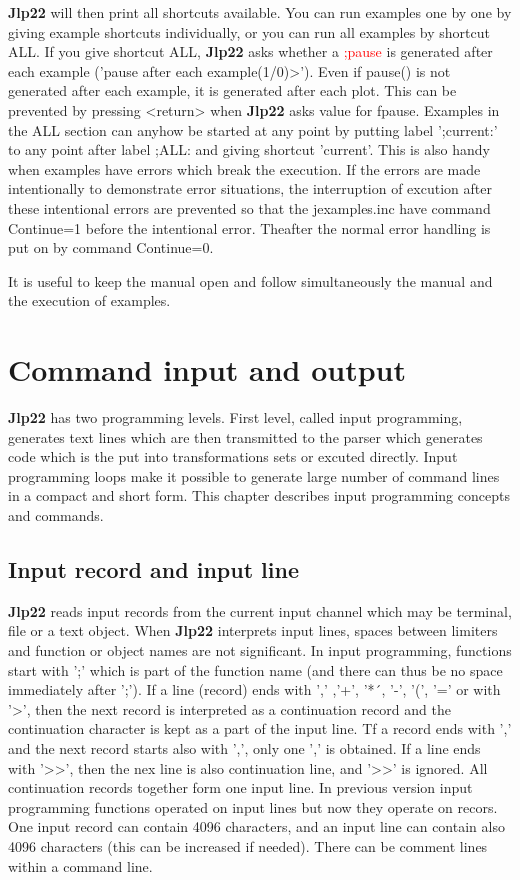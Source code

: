 \textbf{Jlp22} will then print all shortcuts available. You can run examples one by one by giving example shortcuts
individually, or you can run all examples by shortcut ALL. If you give shortcut ALL, \textbf{Jlp22} asks whether
a \textcolor{Red}{;pause} is generated after each example ('pause after each example(1/0)>').
Even if \textcolor{VioletRed}{pause}() is not generated after each example, it is generated after each plot.
This can be prevented by pressing <return> when \textbf{Jlp22} asks value for fpause. Examples in the ALL section can anyhow be started
at any point by putting label ';current:' to any point after label ;ALL: and giving shortcut
'current'. This is also handy when examples have errors which break the execution. If the errors are made
intentionally to demonstrate error situations, the interruption of excution after these intentional errors are
prevented so that the jexamples.inc have command Continue=1 before the intentional error. Theafter the normal
error handling is put on by command Continue=0.

It is useful to keep the manual open and follow simultaneously the manual and the execution of examples.



\section{Command input and output}
\label{cominout}
\textbf{Jlp22} has two programming levels. First level, called input programming, generates text lines which are then
transmitted to the parser which generates code which is the put into transformations sets or
excuted directly. Input programming loops make it possible to generate large number of command lines
in a compact and short form. This chapter describes input programming concepts and commands.
\subsection{Input record and input line}
\label{inpuline}
\textbf{Jlp22} reads input records from the current input channel which may be terminal, file or a text object.
When \textbf{Jlp22} interprets input lines, spaces between limiters and function or object names are not
significant. In input programming, functions start with ';' which is part of the function name (and
there can thus be no space immediately after ';'). If a line (record) ends with ',' ,'+', '*´, '-',
'(', '=' or with '>', then the next record is interpreted as a continuation record and
the continuation character is kept as a part of the input
line. Tf a record ends with ',' and the next record starts also with ',', only one ',' is obtained. If a line ends with '>{}>', then
the nex line is also continuation line, and  '>{}>' is ignored. All continuation
records together form one input line. In previous version input programming functions operated on input lines
but now they operate on recors. One input record can contain 4096 characters, and an input line can contain also 4096 characters
(this can be increased if needed).
There can be comment lines within a command line.

